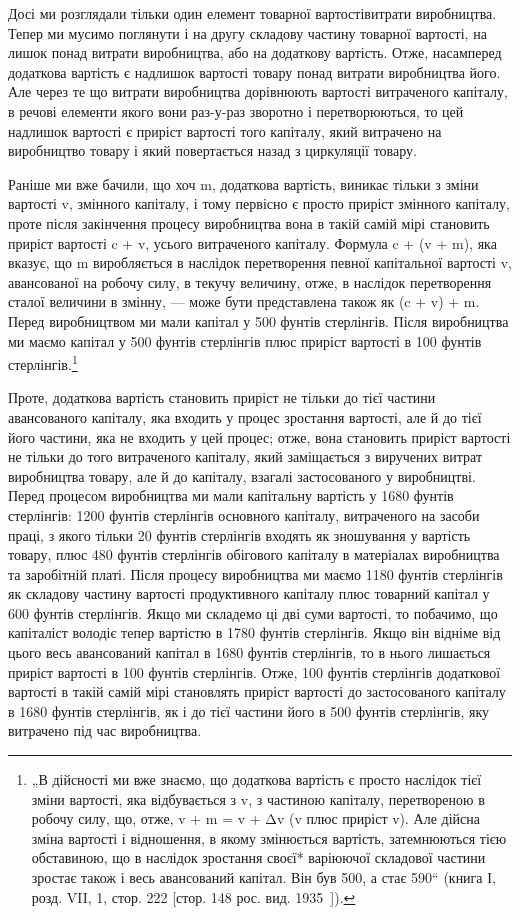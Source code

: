 Досі ми розглядали тільки один елемент товарної вартостівитрати
виробництва. Тепер ми мусимо поглянути і на другу
складову частину товарної вартості, на лишок понад витрати
виробництва, або на додаткову вартість. Отже, насамперед додаткова
вартість є надлишок вартості товару понад витрати виробництва
його. Але через те що витрати виробництва дорівнюють
вартості витраченого капіталу, в речові елементи якого вони
раз-у-раз зворотно і перетворюються, то цей надлишок вартості
є приріст вартості того капіталу, який витрачено на виробництво
товару і який повертається назад з циркуляції товару.

Раніше ми вже бачили, що хоч m, додаткова вартість, виникає
тільки з зміни вартості v, змінного капіталу, і тому первісно
є просто приріст змінного капіталу, проте після закінчення
процесу виробництва вона в такій самій мірі становить
приріст вартості c + v, усього витраченого капіталу. Формула
c + (v + m), яка вказує, що m виробляється в наслідок перетворення
певної капітальної вартості v, авансованої на робочу силу,
в текучу величину, отже, в наслідок перетворення сталої величини
в змінну, — може бути представлена також як (c + v) + m.
Перед виробництвом ми мали капітал у 500 фунтів стерлінгів.
Після виробництва ми маємо капітал у 500 фунтів стерлінгів
плюс приріст вартості в 100 фунтів стерлінгів.\footnote{
„В дійсності ми вже знаємо, що додаткова вартість є просто наслідок
тієї зміни вартості, яка відбувається з v, з частиною капіталу, перетвореною
в робочу силу, що, отже, v + m = v + Δv (v плюс приріст v). Але дійсна зміна
вартості і відношення, в якому змінюється вартість, затемнюються тією обставиною,
що в наслідок зростання своєї* варіюючої складової частини зростає
також і весь авансований капітал. Він був 500, а стає 590“ (книга І, розд.
VII, 1, стор. 222 [стор. 148 рос. вид. 1935~]).
}

Проте, додаткова вартість становить приріст не тільки до
тієї частини авансованого капіталу, яка входить у процес зростання
вартості, але й до тієї його частини, яка не входить у цей
процес; отже, вона становить приріст вартості не тільки до того
витраченого капіталу, який заміщається з виручених витрат виробництва
товару, але й до капіталу, взагалі застосованого у виробництві.
Перед процесом виробництва ми мали капітальну
вартість у 1680 фунтів стерлінгів: 1200 фунтів стерлінгів основного
капіталу, витраченого на засоби праці, з якого тільки
20 фунтів стерлінгів входять як зношування у вартість товару,
плюс 480 фунтів стерлінгів обігового капіталу в матеріалах виробництва
та заробітній платі. Після процесу виробництва ми
маємо 1180 фунтів стерлінгів як складову частину вартості
продуктивного капіталу плюс товарний капітал у 600 фунтів
стерлінгів. Якщо ми складемо ці дві суми вартості, то побачимо,
що капіталіст володіє тепер вартістю в 1780 фунтів стерлінгів.
Якщо він відніме від цього весь авансований капітал в 1680
фунтів стерлінгів, то в нього лишається приріст вартості в 100
фунтів стерлінгів. Отже, 100 фунтів стерлінгів додаткової вартості
в такій самій мірі становлять приріст вартості до застосованого
капіталу в 1680 фунтів стерлінгів, як і до тієї частини
його в 500 фунтів стерлінгів, яку витрачено під час виробництва.

